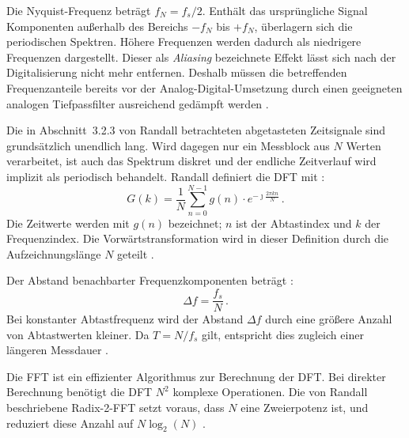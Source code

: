 Die Nyquist-Frequenz beträgt $f_N=f_s/2$. Enthält das ursprüngliche Signal Komponenten
außerhalb des Bereichs $-f_N$ bis $+f_N$, überlagern sich die periodischen Spektren. Höhere
Frequenzen werden dadurch als niedrigere Frequenzen dargestellt. Dieser als \emph{Aliasing}
bezeichnete Effekt lässt sich nach der Digitalisierung nicht mehr entfernen. Deshalb müssen
die betreffenden Frequenzanteile bereits vor der Analog-Digital-Umsetzung durch einen
geeigneten analogen Tiefpassfilter ausreichend gedämpft werden
\cite[S.~70--71, Abschn.~3.2.3, Abb.~3.6(c);
S.~84--86, Abschn.~3.2.8.1, Abb.~3.19--3.20]
{randallVibrationbasedConditionMonitoring2022}.


Die in Abschnitt~3.2.3 von Randall betrachteten abgetasteten Zeitsignale sind grundsätzlich
unendlich lang. Wird dagegen nur ein Messblock aus $N$ Werten verarbeitet, ist auch das
Spektrum diskret und der endliche Zeitverlauf wird implizit als periodisch behandelt. Randall
definiert die DFT mit \cite[S.~70, Abschn.~3.2.4, Gl.~(3.28)]
{randallVibrationbasedConditionMonitoring2022}:
\begin{equation}
    G(k)=\frac{1}{N}\sum_{n=0}^{N-1}g(n)
    \cdot e^{-\jmath\frac{2\pi kn}{N}}\,.
    \label{eq:dft}
\end{equation}
Die Zeitwerte werden mit $g(n)$ bezeichnet; $n$ ist der Abtastindex und $k$
der Frequenzindex. Die Vorwärtstransformation wird in dieser Definition durch
die Aufzeichnungslänge $N$ geteilt
\cite[S.~70, Abschn.~3.2.4, Gl.~(3.28)--(3.30)]
{randallVibrationbasedConditionMonitoring2022}.

Der Abstand benachbarter Frequenzkomponenten beträgt
\cite[S.~83, Abschn.~3.2.7]{randallVibrationbasedConditionMonitoring2022}:
\begin{equation}
    \Delta f = \frac{f_s}{N}\,.
    \label{eq:dft_frequency_grid}
\end{equation}
Bei konstanter Abtastfrequenz wird der Abstand $\Delta f$ durch eine größere
Anzahl von Abtastwerten kleiner. Da $T=N/f_s$ gilt, entspricht dies zugleich
einer längeren Messdauer
\cite[S.~83, Abschn.~3.2.7; S.~85, Abb.~3.19]
{randallVibrationbasedConditionMonitoring2022}.

Die FFT ist ein effizienter Algorithmus zur Berechnung der DFT. Bei direkter Berechnung benötigt
die DFT $N^2$ komplexe Operationen. Die von Randall beschriebene Radix-2-FFT
setzt voraus, dass $N$ eine Zweierpotenz ist, und reduziert diese Anzahl auf
$N\log_2(N)$
\cite[S.~72--73, Abschn.~3.2.5]
{randallVibrationbasedConditionMonitoring2022}.

